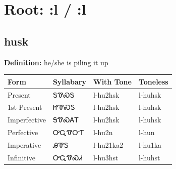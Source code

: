 \documentclass{article}%
\begin{document}
%
\normalsize%
\section*{Root: :l / :l}%
\subsection*{husk}%
\textbf{Definition: }%
he/she is piling it up%
\\[0.5em]%
\begin{tabular}{|l|l|l|l|}%
\hline%
\textbf{Form}&\textbf{Syllabary}&\textbf{With Tone}&\textbf{Toneless}\\%
\hline%
Present&ᎦᏡᏍᎦ&l{-}hu2hsk&l{-}huhsk\\%
1st Present&ᏥᏡᏍᎦ&l{-}hu2hsk&l{-}huhsk\\%
Imperfective&ᎦᏡᏍᎪᎢ&l{-}hu2hsk&l{-}huhsk\\%
Perfective&ᎤᏩᏡᏅᎢ&l{-}hu2n&l{-}hun\\%
Imperative&ᎯᏡᎦ&l{-}hu21ka2&l{-}hu1ka\\%
Infinitive&ᎤᏩᏡᏍᏗ&l{-}hu3hst&l{-}huhst\\%
\hline%
\end{tabular}%
\\[1em]%
\end{document}
